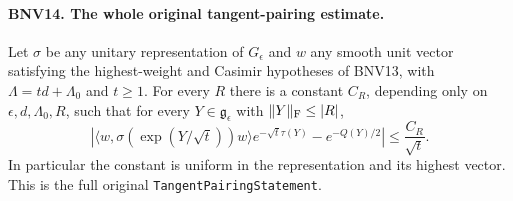 \documentclass[11pt,a4paper]{article}
\numberwithin{equation}{section}
\theoremstyle{remark}\newtheorem{remark}[theorem]{Remark}
\begin{document}
\paragraph{BNV14. The whole original tangent-pairing estimate.}
\label{claim:BNV14}
Let $\sigma$ be any unitary representation of $G_\epsilon$ and $w$ any
smooth unit vector satisfying the highest-weight and Casimir hypotheses
of BNV13, with $\Lambda=td+\Lambda_0$ and $t\ge1$.
For every $R$ there is a constant $C_R$, depending only on
$\epsilon,d,\Lambda_0,R$, such that for every
$Y\in\mathfrak g_\epsilon$ with $\|Y\|_{\rm F}\le |R|$,
\[
 \left|
 \langle w,\sigma(\exp(Y/\sqrt t))w\rangle
       e^{-\sqrt t\tau(Y)}-e^{-Q(Y)/2}
 \right|\le\frac{C_R}{\sqrt t}.
 \tag{BNV.22}
\]
In particular the constant is uniform in the representation and its
highest vector.  This is the full original \texttt{Tangent\allowbreak Pairing\allowbreak Statement}.
\end{document}
